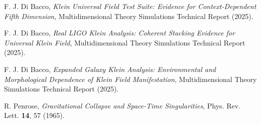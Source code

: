 \documentclass[aps,prl,twocolumn,showpacs,superscriptaddress,groupedaddress]{revtex4-1}
\begin{document}
\begin{thebibliography}{50}
F. J. Di Bacco,
\textit{Klein Universal Field Test Suite: Evidence for Context-Dependent Fifth Dimension},
Multidimensional Theory Simulations Technical Report (2025).

F. J. Di Bacco,
\textit{Real LIGO Klein Analysis: Coherent Stacking Evidence for Universal Klein Field},
Multidimensional Theory Simulations Technical Report (2025).

F. J. Di Bacco,
\textit{Expanded Galaxy Klein Analysis: Environmental and Morphological Dependence of Klein Field Manifestation},
Multidimensional Theory Simulations Technical Report (2025).

R. Penrose,
\textit{Gravitational Collapse and Space-Time Singularities},
Phys. Rev. Lett. \textbf{14}, 57 (1965).

\end{thebibliography}
\end{document}
